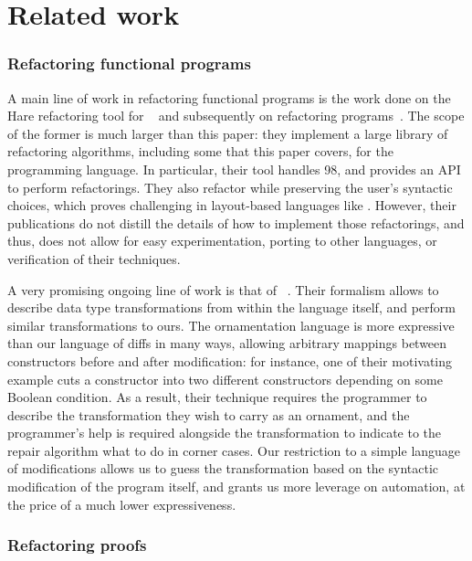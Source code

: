\chapter{Related work}

\subsection*{Refactoring functional programs}

A main line of work in refactoring functional programs is the work done on the
Hare refactoring tool for \Haskell{}~\citep{li2005haskell} and subsequently on
refactoring \Erlang{} programs~\citep{li2006}.  The scope of the former is much
larger than this paper: they implement a large library of refactoring
algorithms, including some that this paper covers, for the \Haskell{}
programming language.  In particular, their tool handles \Haskell{} 98, and
provides an API to perform refactorings.  They also refactor while preserving
the user's syntactic choices, which proves challenging in layout-based languages
like \Haskell{}.  However, their publications do not distill the details of how
to implement those refactorings, and thus, does not allow for easy
experimentation, porting to other languages, or verification of their
techniques.

A very promising ongoing line of work is that of
~\citep{williams2017}.  Their formalism allows to describe
data type transformations from within the language itself, and perform similar
transformations to ours.  The ornamentation language is more expressive than our
language of diffs in many ways, allowing arbitrary mappings between constructors
before and after modification: for instance, one of their motivating example
cuts a constructor into two different constructors depending on some Boolean
condition.  As a result, their technique requires the programmer to describe the
transformation they wish to carry as an ornament, and the programmer's help is
required alongside the transformation to indicate to the repair algorithm what
to do in corner cases.  Our restriction to a simple language of modifications
allows us to guess the transformation based on the syntactic modification of the
program itself, and grants us more leverage on automation, at the price of a
much lower expressiveness.

\subsection*{Refactoring proofs}

